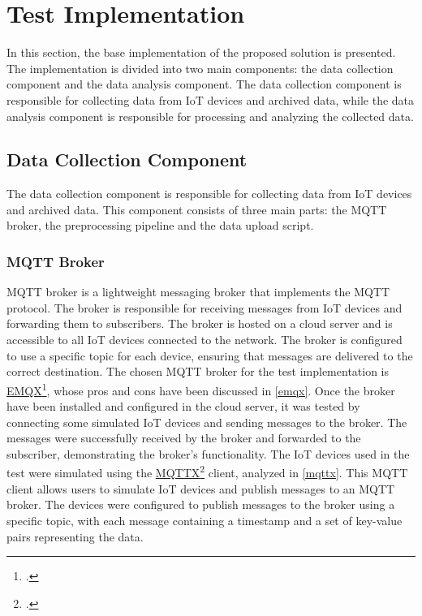 \section{Test Implementation}

In this section, the base implementation of the proposed solution is presented. The implementation is divided into two main components: the data collection component and the data analysis component. The data collection component is responsible for collecting data from IoT devices and archived data, while the data analysis component is responsible for processing and analyzing the collected data.

\subsection{Data Collection Component}

The data collection component is responsible for collecting data from IoT devices and archived data. This component consists of three main parts: the MQTT broker, the preprocessing pipeline and the data upload script.

\subsubsection{MQTT Broker}
MQTT broker is a lightweight messaging broker that implements the MQTT protocol. The broker is responsible for receiving messages from IoT devices and forwarding them to subscribers. The broker is hosted on a cloud server and is accessible to all IoT devices connected to the network. The broker is configured to use a specific topic for each device, ensuring that messages are delivered to the correct destination. 
The chosen MQTT broker for the test implementation is \href{https://www.emqx.io/}{EMQX}\footcite{site:emqx}, whose pros and cons have been discussed in \ref{emqx}.
Once the broker have been installed and configured in the cloud server, it was tested by connecting some simulated IoT devices and sending messages to the broker. The messages were successfully received by the broker and forwarded to the subscriber, demonstrating the broker's functionality.
The IoT devices used in the test were simulated using the \href{https://mqttx.app/}{MQTTX}\footcite{site:mqttx} client, analyzed in \ref{mqttx}. This MQTT client allows users to simulate IoT devices and publish messages to an MQTT broker. The devices were configured to publish messages to the broker using a specific topic, with each message containing a timestamp and a set of key-value pairs representing the data.

